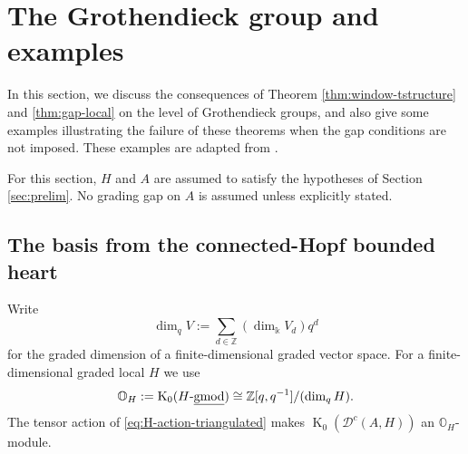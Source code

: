 \documentclass[11pt]{article}
\theoremstyle{definition}
\newtheorem{rem}[thm]{Remark}
\numberwithin{equation}{section}
\def\udgmod{\mbox{-\underline{gmod}}}
\newcommand{\kk}{\Bbbk}
\newcommand{\Dc}{\mathcal{D}^c(A,H)}
\newcommand{\K}{\operatorname{K}_0}
\newcommand{\OH}{\mathbb{O}_H}
\begin{document}

\section{The Grothendieck group and examples}\label{sec:K0}
In this section, we discuss the consequences of Theorem \ref{thm:window-tstructure} and \ref{thm:gap-local} on the level of Grothendieck groups, and also give some examples illustrating the failure of these theorems when the gap conditions are not imposed. These examples are adapted from \cite{BoocherDeVries}.

For this section, $H$ and $A$ are assumed to satisfy the hypotheses of Section \ref{sec:prelim}. No grading gap on $A$ is assumed unless explicitly stated.


\subsection{The basis from the connected-Hopf bounded heart}\label{sec:K0-connected-heart}
Write
\[
\operatorname{dim}_q V:=\sum_{d\in\mathbb Z}(\dim_\kk V_d)q^d
\]
for the graded dimension of a finite-dimensional graded vector space. 
For a finite-dimensional graded local $H$ we use
\[
 \mathbb{O}_H:=\K(H\udgmod)
 \cong\mathbb Z[q,q^{-1}]/(\dim_qH).
\]
The tensor action of \eqref{eq:H-action-triangulated} makes $\K(\Dc)$ an $\OH$-module. 
\end{document}
